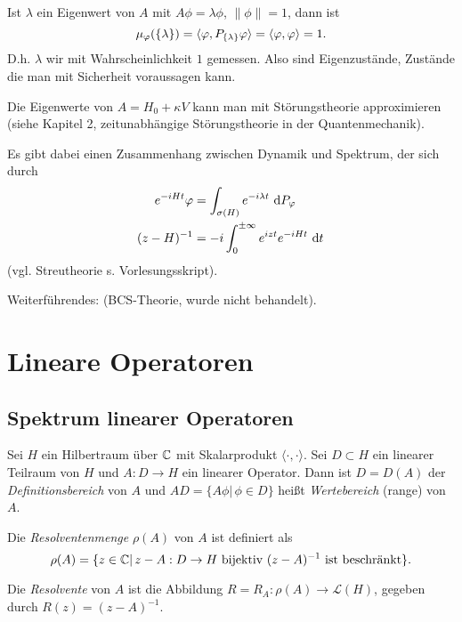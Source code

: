 \documentclass{mycourse}
\begin{document}
Ist $\lambda$ ein Eigenwert von $A$ mit $A\phi = \lambda \phi$, $\| \phi \|=1$, dann ist
\[
\mu_\phi(\{\lambda \}) = \< \phi, P_{\{\lambda\}} \phi \> = \< \phi, \phi \> =1.
\]
D.h. $\lambda$ wir mit Wahrscheinlichkeit $1$ gemessen. Also sind Eigenzustände, Zustände die man mit Sicherheit voraussagen kann.

Die Eigenwerte von $A= H_0 + \kappa V$ kann man mit Störungstheorie approximieren (siehe Kapitel 2, zeitunabhängige Störungstheorie in der Quantenmechanik).

Es gibt dabei einen Zusammenhang zwischen Dynamik und Spektrum, der sich durch
\begin{align*}
e^{-i Ht} \phi &= \int_{\sigma(H)} e^{-i\lambda t} \, \dx[P_\phi]\\
(z-H)^{-1}&= -i \int_0^{\pm \infty} e^{izt} e^{-iHt} \, \dx[t]
\end{align*}
(vgl. Streutheorie s. Vorlesungsskript).


Weiterführendes: (BCS-Theorie, wurde nicht behandelt).

\chapter{Lineare Operatoren}
\section{Spektrum linearer Operatoren}
Sei $H$ ein Hilbertraum über $\C$ mit Skalarprodukt $\langle \cdot, \cdot \rangle$. Sei $D\subset H$ ein linearer Teilraum von $H$ und $A:D\to H$ ein linearer Operator. Dann ist $D=D(A)$ der \emph{Definitionsbereich} von $A$ und $AD=\{A\phi|\, \phi\in D\}$ heißt \emph{Wertebereich} (range) von $A$.

Die \emph{Resolventenmenge} $\rho(A)$ von $A$ ist definiert als 
\[
\rho(A)=\{z\in \C|\, z-A: D\to H \text{ bijektiv $(z-A)^{-1}$ ist beschränkt}\}.
\]

Die \emph{Resolvente} von $A$ ist die Abbildung $R=R_A: \rho(A) \to \mathcal L(H)$, gegeben durch $R(z)=(z-A)^{-1}$.
\end{document}
